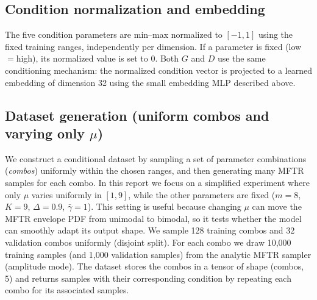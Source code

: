 \subsection{Condition normalization and embedding}
The five condition parameters are min--max normalized to $[-1,1]$ using the fixed training ranges, independently per dimension. If a parameter is fixed (low$=$high), its normalized value is set to 0.
Both $G$ and $D$ use the same conditioning mechanism: the normalized condition vector is projected to a learned embedding of dimension 32 using the small embedding MLP described above.

\subsection{Dataset generation (uniform combos and varying only $\mu$)}
We construct a conditional dataset by sampling a set of parameter combinations (\emph{combos}) uniformly within the chosen ranges, and then generating many MFTR samples for each combo.
In this report we focus on a simplified experiment where only $\mu$ varies uniformly in $[1,9]$, while the other parameters are fixed ($m=8$, $K=9$, $\Delta=0.9$, $\bar{\gamma}=1$). This setting is useful because changing $\mu$ can move the MFTR envelope PDF from unimodal to bimodal, so it tests whether the model can smoothly adapt its output shape.
We sample 128 training combos and 32 validation combos uniformly (disjoint split). For each combo we draw 10{,}000 training samples (and 1{,}000 validation samples) from the analytic MFTR sampler (amplitude mode). The dataset stores the combos in a tensor of shape (combos, 5) and returns samples with their corresponding condition by repeating each combo for its associated samples.
